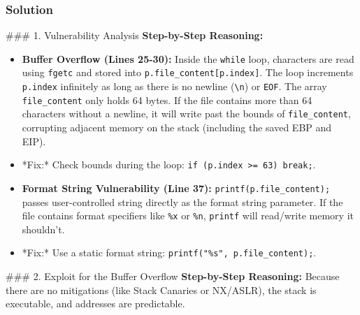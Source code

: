 \documentclass{article}
\begin{document}
\subsubsection*{Solution}
\#\#\# 1. Vulnerability Analysis
\textbf{Step-by-Step Reasoning:}
\begin{itemize}
    \item \textbf{Buffer Overflow (Lines 25-30):} Inside the \texttt{while} loop, characters are read using \texttt{fgetc} and stored into \texttt{p.file\_content[p.index]}. The loop increments \texttt{p.index} infinitely as long as there is no newline (\texttt{\textbackslash{}n}) or \texttt{EOF}. The array \texttt{file\_content} only holds 64 bytes. If the file contains more than 64 characters without a newline, it will write past the bounds of \texttt{file\_content}, corrupting adjacent memory on the stack (including the saved EBP and EIP).
    \item *Fix:* Check bounds during the loop: \texttt{if (p.index >= 63) break;}.
    \item \textbf{Format String Vulnerability (Line 37):} \texttt{printf(p.file\_content);} passes user-controlled string directly as the format string parameter. If the file contains format specifiers like \texttt{\%x} or \texttt{\%n}, \texttt{printf} will read/write memory it shouldn't.
    \item *Fix:* Use a static format string: \texttt{printf("\%s", p.file\_content);}.

\end{itemize}
\#\#\# 2. Exploit for the Buffer Overflow
\textbf{Step-by-Step Reasoning:}
Because there are no mitigations (like Stack Canaries or NX/ASLR), the stack is executable, and addresses are predictable.
\end{document}

